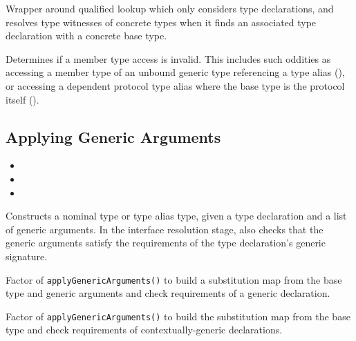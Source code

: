 \documentclass[../generics]{subfiles}
\begin{document}
Wrapper around qualified lookup which only considers type declarations, and resolves type witnesses of concrete types when it finds an associated type declaration with a concrete base type.

Determines if a member type access is invalid. This includes such oddities as accessing a member type of an unbound generic type referencing a type alias (), or accessing a dependent protocol type alias where the base type is the protocol itself ().

\subsection*{Applying Generic Arguments}

\begin{itemize}
\item {}
\item {}
\item {}
\end{itemize}
Constructs a nominal type or type alias type, given a type declaration and a list of generic arguments. In the interface resolution stage, also checks that the generic arguments satisfy the requirements of the type declaration's generic signature.

Factor of \texttt{applyGenericArguments()} to build a substitution map from the base type and generic arguments and check requirements of a generic declaration.

Factor of \texttt{applyGenericArguments()} to build the substitution map from the base type and check requirements of contextually-generic declarations.
\end{document}

